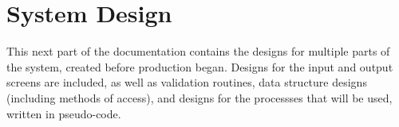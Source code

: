 \cleardoublepage

\part{System Design}
This next part of the documentation contains the designs for multiple parts of the system, created before production began. Designs for the input and output screens are included, as well as validation routines, data structure designs (including methods of access), and designs for the processses that will be used, written in pseudo-code.




